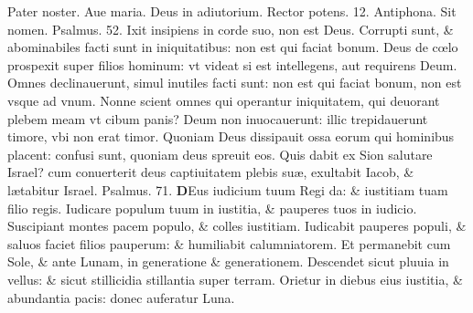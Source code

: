 \documentclass[a5paper,10pt]{book}
\def\ae{æ}
\def\oe{œ}
\begin{document}
\begin{multicols*}{2}
\par \noindent \color{red} P\color{black}ater noster. Aue maria. Deus in adiutorium. Rector potens. 12. \color{red} Antiphona. \color{black} Sit nomen. \color{red} Psalmus. 52. \color{black}
Ixit insipiens in corde suo, non est Deus.
\newline \color{red} C\color{black}orrupti sunt, \& abominabiles facti sunt in iniquitatibus: non est qui faciat bonum.
\newline \color{red} D\color{black}eus de c\oe lo prospexit super filios hominum: vt videat si est intellegens, aut requirens Deum.
\newline \color{red} O\color{black}mnes declinauerunt, simul inutiles facti sunt: non est qui faciat bonum, non est vsque ad vnum.
\newline \color{red} N\color{black}onne scient omnes qui operantur iniquitatem, qui deuorant plebem meam vt cibum panis?
\newline \color{red} D\color{black}eum non inuocauerunt: illic trepidauerunt timore, vbi non erat timor.
\newline \color{red} Q\color{black}uoniam Deus dissipauit ossa eorum qui hominibus placent: confusi sunt, quoniam deus spreuit eos.
\newline \color{red} Q\color{black}uis dabit ex Sion salutare Israel? cum conuerterit deus captiuitatem plebis su\ae , exultabit Iacob, \& l\ae tabitur Israel. \quad \color{red} Psalmus. 71. \color{black} 
\lettrine[lines=2]{\bfseries \color{red} D}{}Eus iudicium tuum Regi da: \& iustitiam tuam filio regis.
\newline \color{red} I\color{black}udicare populum tuum in iustitia, \& pauperes tuos in iudicio.
\newline \color{red} S\color{black}uscipiant montes pacem populo, \& colles iustitiam.
\newline \color{red} I\color{black}udicabit pauperes populi, \& saluos faciet filios pauperum: \& humiliabit calumniatorem.
\newline \color{red} E\color{black}t permanebit cum Sole, \& ante Lunam, in generatione \& generationem.
\newline \color{red} D\color{black}escendet sicut pluuia in vellus: \& sicut stillicidia stillantia super terram.
\newline \color{red} O\color{black}rietur in diebus eius iustitia, \& abundantia pacis: donec auferatur Luna.

\end{multicols*}
\end{document}

